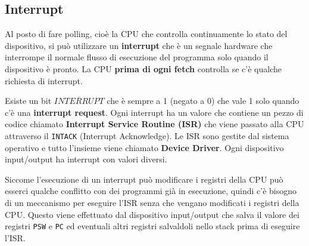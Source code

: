 \documentclass[a4paper]{article}
\theoremstyle{break}
\theoremstyle{break}
\theoremstyle{break}
\theoremstyle{break}
\begin{document}
\subsection{Interrupt}
Al posto di fare polling, cioè la CPU che controlla continuamente lo stato del dispositivo,
si può utilizzare un \textbf{interrupt} che è un segnale hardware che interrompe il normale
flusso di esecuzione del programma solo quando il dispositivo è pronto. La CPU
\textbf{prima di ogni fetch} controlla se c'è qualche richiesta di interrupt.
\begin{figure}[H]
	\centering
\end{figure}

\noindent Esiste un bit \( \overline{INTERRUPT} \) che è sempre a 1 (negato a 0) che
vale 1 solo quando c'è una \textbf{interrupt request}. Ogni interrupt ha un valore
che contiene un pezzo di codice chiamato \textbf{Interrupt Service Routine (ISR)}
che viene passato alla CPU attraverso il \texttt{INTACK} (Interrupt Acknowledge).
Le ISR sono gestite dal sistema operativo e tutto l'insieme viene chiamato \textbf{Device Driver}.
Ogni dispositivo input/output ha interrupt con valori diversi.

\vspace{1em}
\noindent Siccome l'esecuzione di un interrupt può modificare i registri della CPU può esserci
qualche conflitto con dei programmi già in esecuzione, quindi c'è bisogno di un meccanismo
per eseguire l'ISR senza che vengano modificati i registri della CPU. Questo viene
effettuato dal dispositivo input/output che salva il valore dei registri \texttt{PSW} e
\texttt{PC} ed eventuali altri registri salvaldoli nello stack prima di eseguire l'ISR.
\end{document}
